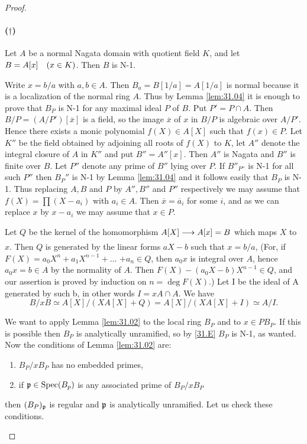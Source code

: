 \documentclass[../main]{subfiles}
\begin{document}
\begin{proof}
\begin{enumerate}
\paragraph{($\dagger$)}\makeatletter\def\@currentlabel{($\dagger$)}\makeatother\label{31.dagger} Let $A$ be a normal Nagata domain with quotient field $K$, and let $B=A[x]\for{x \in K}$. Then $B$ is N-1.

Write $x=b / a$ with $a, b \in A$. Then $B_{a}=B[1 / a]=A[1 / a]$ is normal because it is a localization of the normal ring $A$. Thus by Lemma \ref{lem:31.04} it is enough to prove that $B_{P}$ is N-1 for any maximal ideal $P$ of $B$. Put $P'=P \cap A$. Then $B / P=(A / P')[\overline{x}]$ is a field, so the image $\overline{x}$ of $x$ in $B / P$ is algebraic over $A / P'$. Hence there exists a monic polynomial $f(X) \in A[X]$ such that $f(x) \in P$. Let $K''$ be the field obtained by adjoining all roots of $f(X)$ to $K$, let $A''$ denote the integral closure of $A$ in $K''$ and put $B''=A''[x]$. Then $A''$ is Nagata and $B''$ is finite over $B$. Let $P''$ denote any prime of $B''$ lying over $P$. If $B''_{P''}$ is N-1 for all such $P''$ then $B_{P}''$ is N-1 by Lemma \ref{lem:31.04} and it follows easily that $B_{P}$ is N-1. Thus replacing $A, B$ and $P$ by $A'', B''$ and $P''$ respectively we may assume that $f(X)=\prod (X-a_{i})$ with $a_{i} \in A$. Then $\overline{x}=\overline{a}_{i}$ for some $i$, and as we can replace $x$ by $x-a_{i}$ we may assume that $x \in P$.

Let $Q$ be the kernel of the homomorphism $A[X] \varrightarrow{} A[x]=B$ which maps $X$ to $x$. Then $Q$ is generated by the linear forms $a X-b$ such that $x=b / a$, (For, if $F(X)=a_{0} X^{n}+a_{1} X^{n-1}+\ldots$ $+a_{n} \in Q$, then $a_{0} x$ is integral over $A$, hence $a_{0} x=b \in A$ by the normality of $A$. Then $F(X)-(a_{0} X-b) X^{n-1} \in Q$, and our assertion is proved by induction on $n=\deg F(X)$.) Let I be the ideal of A generated by such b, in other words $I=xA \cap A$. We have \[B / x B \simeq A[X] /(X A[X]+Q)=A[X] /(X A[X]+I)\simeq A / I.\]

We want to apply Lemma \ref{lem:31.02} to the local ring $B_P$ and to $x \in PB_{P}$. If this is possible then $B_{P}$ is analytically unramified, so by \ref{31.E} $B_{P}$ is N-1, as wanted. Now the conditions of Lemma \ref{lem:31.02} are: 
\begin{enumerate}[label=(\arabic*)]
    \item $B_P/xB_P$ has no embedded primes,
    \item if $\mathfrak{p}\in \operatorname{Spec}(B_p)$ is any associated prime of $B_P/xB_P$ 
\end{enumerate}
then $(B_P)_{\mathfrak{p}}$ is regular and $\mathfrak{p}$ is analytically unramified. Let us check these conditions.


\end{enumerate}
\end{proof}
\end{document}
